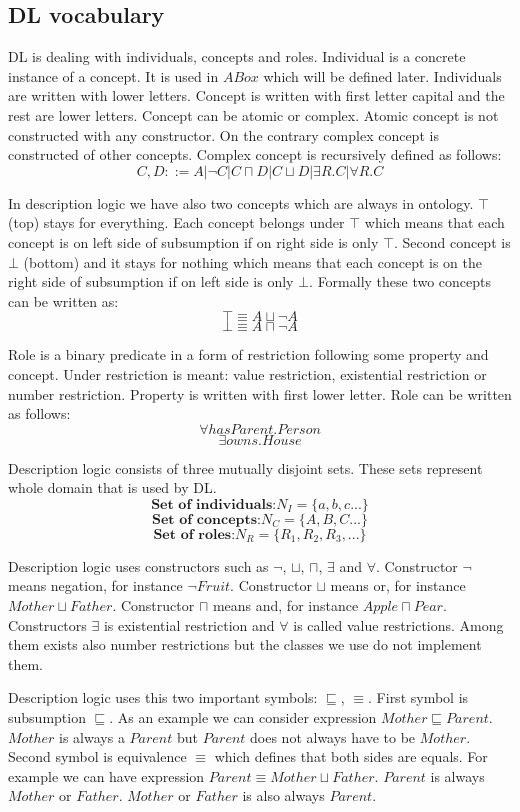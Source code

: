 \documentclass[12pt,a4paper]{article}
\begin{document}
\subsection{DL vocabulary}
DL is dealing with individuals, concepts and roles. Individual is a concrete instance of a concept. It is used in $ABox$ which will be defined later. Individuals are written with lower letters. Concept is written with first letter capital and the rest are lower letters. Concept can be atomic or complex. Atomic concept is not constructed with any constructor. On the contrary complex concept is constructed of other concepts. Complex concept is recursively defined as follows:
\[ C,D ::= A | \neg C | C \sqcap D | C \sqcup D | \exists R.C | \forall R.C  \]

In description logic we have also two concepts which are always in ontology. $\top$ (top) stays for everything. Each concept belongs under $\top$ which means that each concept is on left side of subsumption if on right side is only $\top$. Second concept is $\bot$ (bottom) and it stays for nothing which means that each concept is on the right side of subsumption if on left side is only $\bot$. Formally these two concepts can be written as:
\[ \top \equiv A \sqcup \neg A \]
\[ \bot \equiv A \sqcap \neg A \]

Role is a binary predicate in a form of restriction following some property and concept. Under restriction is meant: value restriction, existential restriction or number restriction. Property is written with first lower letter. Role can be written as follows: \[ \forall hasParent.Person \]
\[\exists owns.House \]	

Description logic consists of three mutually disjoint sets. These sets represent whole domain that is used by DL.
\[ \textbf{Set of individuals:} N_{I} = \{a,b,c...\} \]
\[ \textbf{Set of concepts:} N_{C} = \{A,B,C...\} \]
\[ \textbf{Set of roles:} N_{R} = \{R_{1},R_{2},R_{3},...\} \]

Description logic uses constructors such as $\neg$, $\sqcup$, $\sqcap$, $\exists$ and $\forall$. Constructor $\neg$ means negation, for instance $\neg Fruit$. Constructor $\sqcup$ means or, for instance $Mother \sqcup Father$. Constructor $\sqcap$ means and, for instance $Apple \sqcap Pear$. Constructors $\exists$ is existential restriction and $\forall$ is called value restrictions. Among them exists also number restrictions but the classes we use do not implement them.

Description logic uses this two important symbols: $\sqsubseteq$, $\equiv$. First symbol is subsumption $\sqsubseteq$. As an example we can consider expression $Mother \sqsubseteq Parent$. $Mother$ is always a $Parent$ but $Parent$ does not always have to be $Mother$. Second symbol is equivalence $\equiv$ which defines that both sides are equals. For example we can have expression $Parent \equiv Mother \sqcup Father$. $Parent$ is always $Mother$ or $Father$. $Mother$ or $Father$ is also always $Parent$.
\end{document}
